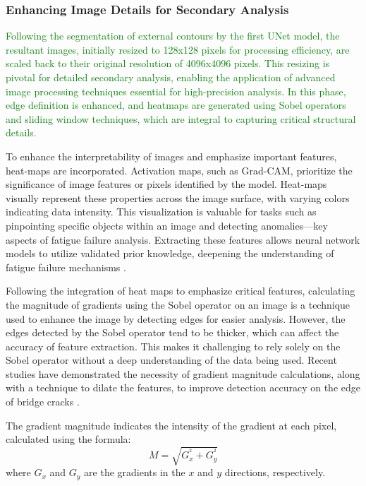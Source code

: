 \documentclass[preprint,12pt]{elsarticle}
\begin{document}
\subsubsection{Enhancing Image Details for Secondary Analysis}
\textcolor{green}{Following the segmentation of external contours by the first UNet model, the resultant images, initially resized to 128x128 pixels for processing efficiency, are scaled back to their original resolution of 4096x4096 pixels. This resizing is pivotal for detailed secondary analysis, enabling the application of advanced image processing techniques essential for high-precision analysis. In this phase, edge definition is enhanced, and heatmaps are generated using Sobel operators and sliding window techniques, which are integral to capturing critical structural details.}

To enhance the interpretability of images and emphasize important features, heat-maps are incorporated. Activation maps, such as Grad-CAM, prioritize the significance of image features or pixels identified by the model. Heat-maps visually represent these properties across the image surface, with varying colors indicating data intensity. This visualization is valuable for tasks such as pinpointing specific objects within an image and detecting anomalies—key aspects of fatigue failure analysis. Extracting these features allows neural network models to utilize validated prior knowledge, deepening the understanding of fatigue failure mechanisms \cite{selvaraju2017grad}.

Following the integration of heat maps to emphasize critical features, calculating the magnitude of gradients using the Sobel operator on an image is a technique used to enhance the image by detecting edges for easier analysis.
However, the edges detected by the Sobel operator tend to be thicker, which can affect the accuracy of feature extraction. This makes it challenging to rely solely on the Sobel operator without a deep understanding of the data being used.
Recent studies have demonstrated the necessity of gradient magnitude calculations, along with a technique to dilate the features, to improve detection accuracy on the edge of bridge cracks \cite{wang2019research}.

The gradient magnitude indicates the intensity of the gradient at each pixel, calculated using the formula:
\begin{equation}
\label{eq:magnitude}
M=\sqrt{G_x^{^2}+G_y^{^2}}
\end{equation}
where $G_x$ and $G_y$ are the gradients in the $x$ and $y$ directions, respectively.
\end{document}
